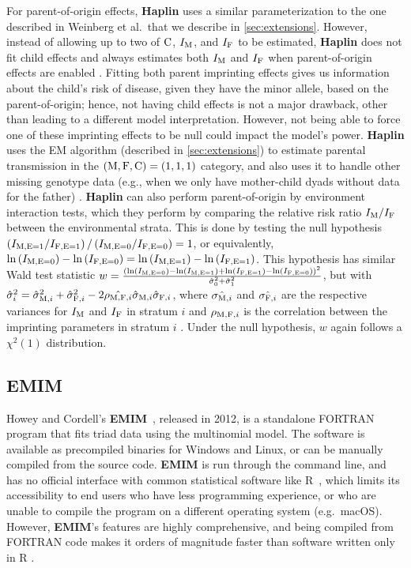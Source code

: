 For parent-of-origin effects, \textbf{Haplin} uses a similar parameterization to the one described in Weinberg et al.\,\cite{Wein+98} that we describe in \cref{sec:extensions}.
However, instead of allowing up to two of ${\rm C}$, $I_{{\rm M}}$, and $I_{{\rm F}}$ to be estimated, \textbf{Haplin} does not fit child effects and always estimates both $I_{{\rm M}}$ and $I_{{\rm F}}$ when parent-of-origin effects are enabled \cite{Gjer+18}.
Fitting both parent imprinting effects gives us information about the child's risk of disease, given they have the minor allele, based on the parent-of-origin; hence, not having child effects is not a major drawback, other than leading to a different model interpretation.
However, not being able to force one of these imprinting effects to be null could impact the model's power.
\textbf{Haplin} uses the EM algorithm (described in \cref{sec:extensions}) to estimate parental transmission in the $({\rm M}, {\rm F}, {\rm C}) = (1,1,1)$ category, and also uses it to handle other missing genotype data (e.g., when we only have mother-child dyads without data for the father) \cite{Gjer+18}.
\textbf{Haplin} can also perform parent-of-origin by environment interaction tests, which they perform by comparing the relative risk ratio $I_{{\rm M}}/I_{{\rm F}}$ between the environmental strata.
This is done by testing the null hypothesis $\left(I_{{\rm M}, {\rm E} = 1}/I_{{\rm F},{\rm E}=1}\right)/\left(I_{{\rm M}, {\rm E} = 0}/I_{{\rm F},{\rm E}=0}\right) = 1$, or equivalently, $\ln\left(I_{{\rm M},{\rm E}=0}\right) - \ln\left(I_{{\rm F},{\rm E}=0}\right) = \ln\left(I_{{\rm M},{\rm E}=1}\right) - \ln\left(I_{{\rm F},{\rm E}=1}\right)$.
This hypothesis has similar Wald test statistic $w = \frac{\left(\ln\left(I_{{\rm M},{\rm E}=0}\right) - \ln\left(I_{{\rm M},{\rm E}=1}\right) + \ln\left(I_{{\rm F},{\rm E}=1}\right) - \ln\left(I_{{\rm F},{\rm E}=0}\right)\right)^2}{\hat{\sigma}_0^2 + \hat{\sigma}_1^2}$, but with $\hat{\sigma}_i^2 = \hat{\sigma}_{{\rm M},i}^2 + \hat{\sigma}_{{\rm F},i}^2 - 2\hat{\rho_{{\rm M},{\rm F},i}}\hat{\sigma}_{{\rm M},i}\hat{\sigma}_{{\rm F},i}$, where $\hat{\sigma_{{\rm M},i}}$ and $\hat{\sigma_{{\rm F},i}}$ are the respective variances for $I_{{\rm M}}$ and $I_{{\rm F}}$ in stratum $i$ and $\rho_{{\rm M},{\rm F},i}$ is the correlation between the imprinting parameters in stratum $i$ \cite{Gjer+18}.
Under the null hypothesis, $w$ again follows a $\chi^2(1)$ distribution.

\subsection{EMIM}

Howey and Cordell's \textbf{EMIM}~\cite{HoweCord12}, released in 2012, is a standalone FORTRAN program that fits triad data using the multinomial model.
The software is available as precompiled binaries for Windows and Linux, or can be manually compiled from the source code.
\textbf{EMIM} is run through the command line, and has no official interface with common statistical software like R~\cite{R21}, which limits its accessibility to end users who have less programming experience, or who are unable to compile the program on a different operating system (e.g.\ macOS).
However, \textbf{EMIM}'s features are highly comprehensive, and being compiled from FORTRAN code makes it orders of magnitude faster than software written only in R \cite{HoweCord12}.

